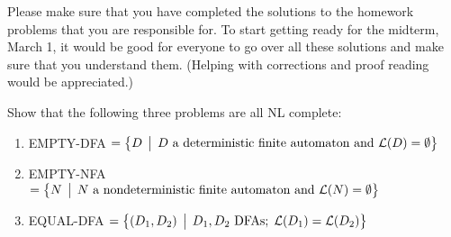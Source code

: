 \documentclass[12pt]{article}
\begin{document}
\thispagestyle{empty}
\noindent{}
\addtocounter{section}{7}

Please make sure that you have completed the solutions to the homework problems that you are
responsible for.   To start getting ready for the midterm, March 1, it would be good for everyone to
go over all these solutions and make sure that you understand them.  (Helping with corrections and
proof reading would be appreciated.)

Show that the following three problems are all NL complete:

\begin{enumerate}
\item  EMPTY-DFA $ = \bigl\{ D \,\bigm|\, D \mbox{ a deterministic finite automaton and } {\cal L}(D) =
  \emptyset \bigr\}$ 

\vspace*{.1in}

\item EMPTY-NFA $ = \bigl\{ N \,\bigm|\, N \mbox{ a nondeterministic finite automaton and } {\cal L}(N) =\emptyset \bigr\}$

\vspace*{.1in}

\item EQUAL-DFA $ =  \bigl\{ (D_1,D_2) \,\bigm|\, D_1,D_2 \mbox{ DFAs};\;{\cal L}(D_1) ={\cal L}(D_2) \bigr\}$


\end{enumerate}
\end{document}

